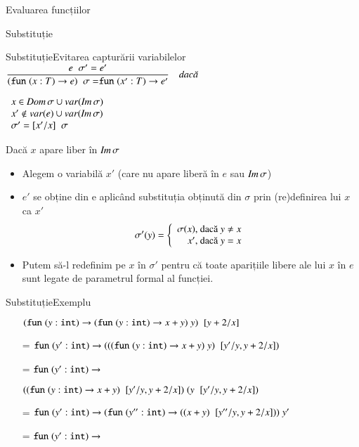\documentclass[xcolor=pdftex,romanian,colorlinks]{beamer}
\begin{document}
\begin{section}{Evaluarea funcțiilor}
\begin{subsection}{Substituție}
\begin{frame}{Substituție}{Evitarea capturării variabilelor}
\( \displaystyle\reg{\substapp{(\Sfun (x:T) \rightarrow e)}{\sigma} = \Sfun (x':T) \rightarrow e'}{\substapp{e}{\sigma'} = e'}{\;}\)

\vspace{-6ex}\hfill$\begin{array}{l}x \in \mathop{\it Dom} \sigma \cup \mathop{var}(\mathop{\it Im} \sigma)\\x' \not\in \mathop{var}(e)\cup\mathop{var}(\mathop{\it Im} \sigma)
\\ \sigma' = [x'/x]\mathrel{}\sigma\end{array}$


\vfill Dacă $x$ apare liber în $\mathop{\it Im} \sigma$
\begin{itemize}
\item Alegem o variabilă  $x'$ (care nu apare liberă în $e$ sau $\mathop{\it Im} \sigma$)
\item $e'$ se obține din e aplicând substituția obținută din $\sigma$ prin (re)definirea lui $x$ ca $x'$
\[\sigma'(y) = \left\{\begin{array}{r@{\mbox{, dacă }}l}\sigma(x)&y\neq x\\x'&y=x\end{array}\right.\]
\item Putem să-l redefinim pe $x$ în $\sigma'$ pentru că toate aparițiile libere ale lui $x$ în $e$ sunt legate de parametrul formal al funcției.
\end{itemize}
\end{frame}

\begin{frame}{Substituție}{Exemplu}
\begin{itemize}
\item[] $(\mathrel{\text{\ttfamily fun}} (y:{\mathrel{\text{\ttfamily int}}}) \rightarrow (\mathrel{\text{\ttfamily fun}} (y:{\mathrel{\text{\ttfamily int}}}) \rightarrow x + y)\; y)\mathrel{}[y+2/x]$
\item[=] $\mathrel{\text{\ttfamily fun}} (y':{\mathrel{\text{\ttfamily int}}}) \rightarrow (((\mathrel{\text{\ttfamily fun}} (y:{\mathrel{\text{\ttfamily int}}}) \rightarrow x + y)\; y)\mathrel{}[y'/y,y+2/x])$
\item[=] $\mathrel{\text{\ttfamily fun}} (y':{\mathrel{\text{\ttfamily int}}}) \rightarrow$

\hfill $((\mathrel{\text{\ttfamily fun}} (y:{\mathrel{\text{\ttfamily int}}}) \rightarrow x + y)\mathrel{}[y'/y,y+2/x])\; (y\mathrel{}[y'/y,y+2/x])$
\item[=] $\mathrel{\text{\ttfamily fun}} (y':{\mathrel{\text{\ttfamily int}}}) \rightarrow (\mathrel{\text{\ttfamily fun}} (y'':{\mathrel{\text{\ttfamily int}}}) \rightarrow ((x + y)\mathrel{}[y''/y,y+2/x]))\; y'$
\item[=] $\mathrel{\text{\ttfamily fun}} (y':{\mathrel{\text{\ttfamily int}}}) \rightarrow $


\end{itemize}
\end{frame}
\end{subsection}
\end{section}
\end{document}
